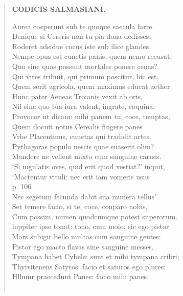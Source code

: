 \documentclass[11pt, a4paper]{report}
\begin{document}
\begin{verse}
    \begin{center} \textbf{CODICIS SALMASIANI.} \end{center} \marginpar{[167]} Aurea coeperunt sub te quoque saecula farre. \\ Denique si Cereris non tu pia dona dedisses, \\ Roderet adsidue cocus iste sub ilice glandes. \\ Nempe opus est cunctis panis, quem nemo recusat; \\ Quo sine quas possunt mortales ponere cenas? \\ Qui vires tribuit, qui primum poscitur, hic est, \\ Quem serit agricola, quem maximus educat aether. \\ Hunc pater Aeneas Troianis vexit ab oris, \\ Nil sine quo tua iura valent, ingrate, coquina. \\ Provocor ut dicam: mihi panem tu, coce, temptas, \\ Quem docuit notus Cerealis fingere panes \\ Vrbe Placentinus, cunctas qui tradidit artes. \\ Pythagoras populo nescis quae suaserit olim? \\ Mandere ne vellent mixto cum sanguine carnes. \\ ‘Si iugulatis oves, quid erit quod vestiat?’ inquit, \\ ‘Mactentur vituli: nec erit iam vomeris usus \\ p. 106 \\ Nec segetum fecunda dabit sua munera tellus’ \\ Set temere facio, si te, coce, conparo nobis, \\ Cum possim, numen quodcumque potest superorum. \\ luppiter ipse tonat: tono, cum molo, sic ego pistor. \\ Mars subigit bello mnltas cum sanguine gentes: \\ Pistor ego macto flavas sine sanguine messes. \\ Tympana habet Cybele: sunt et mihi tympana cribri; \\ Thyrsitenens Satyros: facio et saturos ego plures; \\ Hllumr praecedunt Panes: facio mihi panes. \\ 
        ﻿\pagebreak 

\end{verse}
\end{document}
